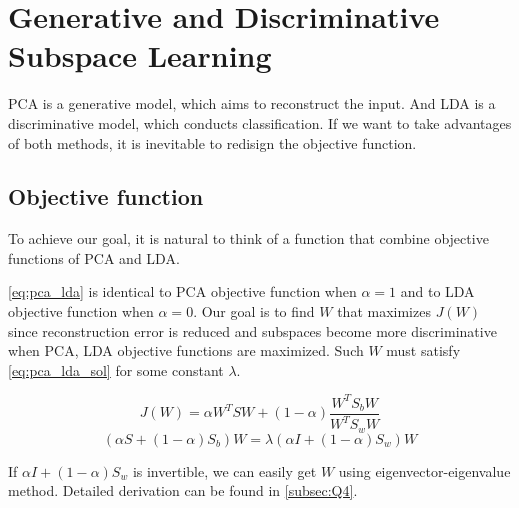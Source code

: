 \section{Generative and Discriminative Subspace Learning}
\label{sec:intro}

PCA is a generative model, which aims to reconstruct the input. And LDA is a discriminative model, which conducts classification. If we want to take advantages of both methods, it is inevitable to redisign the objective function.

\subsection{Objective function}
To achieve our goal, it is natural to think of a function that combine objective functions of PCA and LDA.

\cref{eq:pca_lda} is identical to PCA objective function when $\alpha=1$ and to LDA objective function when $\alpha=0$. Our goal is to find $W$ that maximizes $J(W)$ since reconstruction error is reduced and subspaces become more discriminative when PCA, LDA objective functions are maximized. Such $W$ must satisfy \cref{eq:pca_lda_sol} for some constant $\lambda$.

\vspace{-0.2cm}
\begin{equation}
  J(W) = \alpha W^TSW+(1-\alpha) \frac{W^TS_bW}{W^TS_wW}
  \label{eq:pca_lda}
\end{equation}
\vspace{-0.2cm}
\begin{equation}
  (\alpha S+(1-\alpha)S_b)W = \lambda (\alpha I + (1-\alpha)S_w)W
  \label{eq:pca_lda_sol}
\end{equation}

If $\alpha I + (1-\alpha)S_w$ is invertible, we can easily get $W$ using eigenvector-eigenvalue method. Detailed derivation can be found in \cref{subsec:Q4}.
